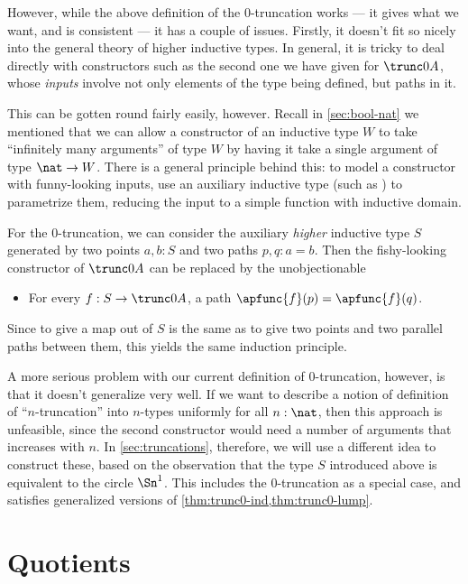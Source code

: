 However, while the above definition of the 0-truncation works --- it gives what we want, and is consistent --- it has a couple of issues.
Firstly, it doesn't fit so nicely into the general theory of higher inductive types.
In general, it is tricky to deal directly with constructors such as the second one we have given for $\trunc0A$, whose \emph{inputs} involve not only elements of the type being defined, but paths in it.

This can be gotten round fairly easily, however.
Recall in \cref{sec:bool-nat} we mentioned that we can allow a constructor of an inductive type $W$ to take ``infinitely many arguments'' of type $W$ by having it take a single argument of type $\nat\to W$.
There is a general principle behind this: to model a constructor with funny-looking inputs, use an auxiliary inductive type (such as \nat) to parametrize them, reducing the input to a simple function with inductive domain.

For the 0-truncation, we can consider the auxiliary \emph{higher} inductive type $S$ generated by two points $a,b:S$ and two paths $p,q:a=b$.
Then the fishy-looking constructor of $\trunc 0A$ can be replaced by the unobjectionable
\begin{itemize}
\item For every $f:S\to \trunc 0A$, a path $\apfunc{f}(p) = \apfunc{f}(q)$.
\end{itemize}
Since to give a map out of $S$ is the same as to give two points and two parallel paths between them, this yields the same induction principle.

%

%
%
A more serious problem with our current definition of $0$-truncation, however, is that it doesn't generalize very well.
If we want to describe a notion of definition of ``$n$-truncation'' into $n$-types uniformly for all $n:\nat$, then this approach is unfeasible, since the second constructor would need a number of arguments that increases with $n$.
In \cref{sec:truncations}, therefore, we will use a different idea to construct these, based on the observation that the type $S$ introduced above is equivalent to the circle $\Sn^1$.
This includes the 0-truncation as a special case, and satisfies generalized versions of \cref{thm:trunc0-ind,thm:trunc0-lump}.


\section{Quotients}
\label{sec:set-quotients}

